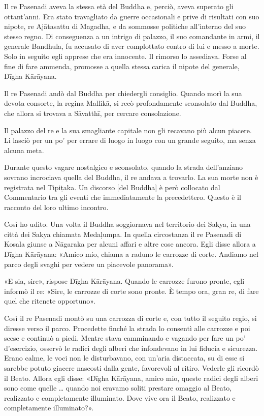 Il re Pasenadi aveva la stessa età del Buddha e,
perciò, aveva superato gli ottant’anni. Era stato travagliato da guerre
occasionali e prive di risultati con suo nipote, re Ajātasattu di Magadha, e da
sommosse politiche all’interno del suo stesso regno. Di conseguenza a un intrigo
di palazzo, il suo comandante in armi, il generale Bandhula, fu accusato di aver
complottato contro di lui e messo a morte. Solo in seguito egli apprese che era
innocente. Il rimorso lo assediava. Forse al fine di fare ammenda, promosse a
quella stessa carica il nipote del generale, Dīgha Kārāyana.


 Il re Pasenadi andò dal Buddha per chiedergli
consiglio. Quando morì la sua devota consorte, la regina Mallikā, si recò
profondamente sconsolato dal Buddha, che allora si trovava a Sāvatthī, per
cercare consolazione.


 Il palazzo del re e la sua smagliante capitale non
gli recavano più alcun piacere. Li lasciò per un po’ per errare di luogo in
luogo con un grande seguito, ma senza alcuna meta.

 Durante questo vagare nostalgico e sconsolato,
quando la strada dell’anziano sovrano incrociava quella del Buddha, il re andava
a trovarlo. La sua morte non è registrata nel Tipiṭaka. Un discorso [del Buddha]
è però collocato dal Commentario tra gli eventi che immediatamente la
precedettero. Questo è il racconto del loro ultimo incontro.

 Così ho udito. Una volta il Buddha soggiornava nel
territorio dei Sakya, in una città dei Sakya chiamata Medaḷumpa. In quella
circostanza il re Pasenadi di Kosala giunse a Nāgaraka per alcuni affari e altre
cose ancora. Egli disse allora a Dīgha Kārāyana: «Amico mio, chiama a raduno le
carrozze di corte. Andiamo nel parco degli svaghi per vedere un piacevole
panorama».

«E sia, sire», rispose Dīgha Kārāyana. Quando le carrozze furono pronte, egli
informò il re: «Sire, le carrozze di corte sono pronte. È tempo ora, gran re, di
fare quel che ritenete opportuno».

Così il re Pasenadi montò su una carrozza di corte e, con tutto il seguito
regio, si diresse verso il parco. Procedette finché la strada lo consentì alle
carrozze e poi scese e continuò a piedi. Mentre stava camminando e vagando per
fare un po’ d’esercizio, osservò le radici degli alberi che infondevano in lui
fiducia e sicurezza. Erano calme, le voci non le disturbavano, con un’aria
distaccata, su di esse si sarebbe potuto giacere nascosti dalla gente,
favorevoli al ritiro. Vederle gli ricordò il Beato. Allora egli disse: «Dīgha
Kārāyana, amico mio, queste radici degli alberi sono come quelle … quando noi
eravamo soliti prestare omaggio al Beato, realizzato e completamente illuminato.
Dove vive ora il Beato, realizzato e completamente illuminato?».


